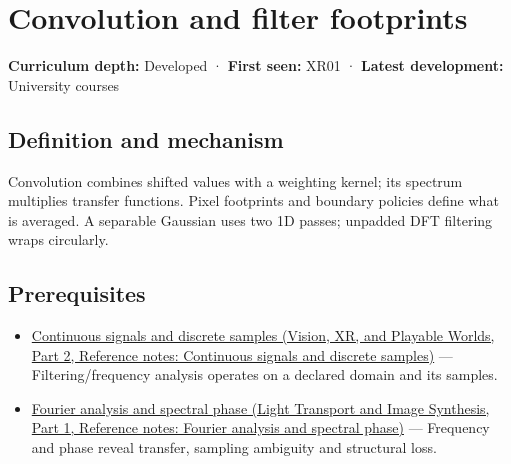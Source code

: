 \hypertarget{appendix-d5b3c692d9f0}{}\label{referencestart:appendix-d5b3c692d9f0}
\section{Convolution and filter footprints}\label{appendix-d5b3c692d9f0-convolution-and-filter-footprints}

\hypertarget{appendix-d5b3c692d9f0-convolution-and-filter-footprints}{}

\textbf{Curriculum depth:} Developed · \textbf{First seen:} XR01 · \textbf{Latest development:} University courses

\begin{allmightroledefinition}

\subsection{Definition and mechanism}\label{appendix-d5b3c692d9f0-definition-and-mechanism}

\hypertarget{appendix-d5b3c692d9f0-definition-and-mechanism}{}

Convolution combines shifted values with a weighting kernel; its spectrum multiplies transfer functions. Pixel footprints and boundary policies define what is averaged. A separable Gaussian uses two 1D passes; unpadded DFT filtering wraps circularly.

\end{allmightroledefinition}

\subsection{Prerequisites}\label{appendix-d5b3c692d9f0-prerequisites}

\hypertarget{appendix-d5b3c692d9f0-prerequisites}{}

\begin{itemize}
\tightlist
\item
  \href{../07-Vision-XR-and-Playable-Worlds-P02/main.pdf\#nameddest=appendix-1077ea8fc737}{Continuous signals and discrete samples (Vision, XR, and Playable Worlds, Part 2, Reference notes: Continuous signals and discrete samples)} --- Filtering/frequency analysis operates on a declared domain and its samples.
\item
  \href{../04-Light-Transport-and-Image-Synthesis-P01/main.pdf\#nameddest=appendix-b60686ba06a1}{Fourier analysis and spectral phase (Light Transport and Image Synthesis, Part 1, Reference notes: Fourier analysis and spectral phase)} --- Frequency and phase reveal transfer, sampling ambiguity and structural loss.
\end{itemize}

